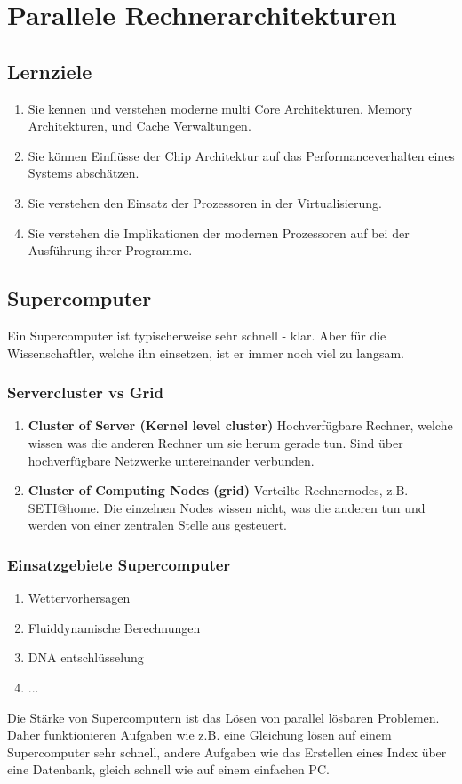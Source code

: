 \chapter{Parallele Rechnerarchitekturen}
\section{Lernziele}
\begin{enumerate}
	\item Sie kennen und verstehen moderne multi Core Architekturen, Memory Architekturen, und Cache Verwaltungen.
	\item Sie können Einflüsse der Chip Architektur auf das	Performanceverhalten eines Systems abschätzen.
	\item Sie verstehen den Einsatz der Prozessoren in der Virtualisierung.
	\item Sie verstehen die Implikationen der modernen Prozessoren auf bei der Ausführung ihrer Programme.
\end{enumerate}
\section{Supercomputer}
Ein Supercomputer ist typischerweise sehr schnell - klar. Aber für die Wissenschaftler, welche ihn einsetzen, ist er immer noch viel zu langsam.
\subsection{Servercluster vs Grid}
\begin{enumerate}
	\item \textbf{Cluster of Server (Kernel level cluster)}
		\subitem Hochverfügbare Rechner, welche wissen was die anderen Rechner um sie herum gerade tun. Sind über hochverfügbare Netzwerke untereinander verbunden.
	\item \textbf{Cluster of Computing Nodes (grid)}
		\subitem Verteilte Rechnernodes, z.B. SETI@home. Die einzelnen Nodes wissen nicht, was die anderen tun und werden von einer zentralen Stelle aus gesteuert.
\end{enumerate}
\subsection{Einsatzgebiete Supercomputer}
\begin{enumerate}
	\item Wettervorhersagen
	\item Fluiddynamische Berechnungen
	\item DNA entschlüsselung
	\item ...
\end{enumerate}
Die Stärke von Supercomputern ist das Lösen von parallel lösbaren Problemen. Daher funktionieren Aufgaben wie z.B. eine Gleichung lösen auf einem Supercomputer sehr schnell, andere Aufgaben wie das Erstellen eines Index über eine Datenbank, gleich schnell wie auf einem einfachen PC.
